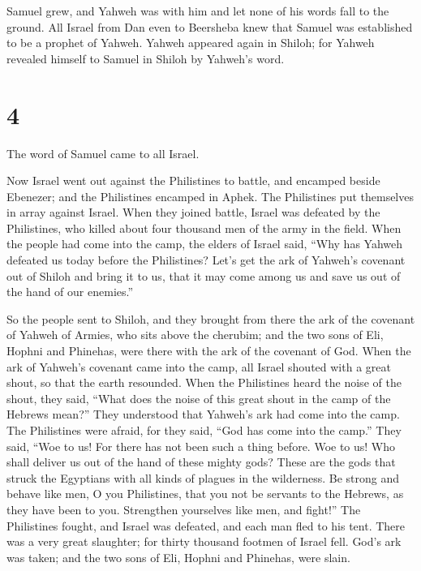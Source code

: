  Samuel grew, and Yahweh was with him and let none of his
words fall to the ground.  All Israel from Dan even to
Beersheba knew that Samuel was established to be a prophet of Yahweh.
 Yahweh appeared again in Shiloh; for Yahweh revealed
himself to Samuel in Shiloh by Yahweh's word.

\hypertarget{section-3}{%
\section{4}\label{section-3}}

 The word of Samuel came to all Israel.

Now Israel went out against the Philistines to battle, and encamped
beside Ebenezer; and the Philistines encamped in Aphek. 
The Philistines put themselves in array against Israel. When they joined
battle, Israel was defeated by the Philistines, who killed about four
thousand men of the army in the field.  When the people
had come into the camp, the elders of Israel said, ``Why has Yahweh
defeated us today before the Philistines? Let's get the ark of Yahweh's
covenant out of Shiloh and bring it to us, that it may come among us and
save us out of the hand of our enemies.''

 So the people sent to Shiloh, and they brought from there
the ark of the covenant of Yahweh of Armies, who sits above the
cherubim; and the two sons of Eli, Hophni and Phinehas, were there with
the ark of the covenant of God.  When the ark of Yahweh's
covenant came into the camp, all Israel shouted with a great shout, so
that the earth resounded.  When the Philistines heard the
noise of the shout, they said, ``What does the noise of this great shout
in the camp of the Hebrews mean?'' They understood that Yahweh's ark had
come into the camp.  The Philistines were afraid, for they
said, ``God has come into the camp.'' They said, ``Woe to us! For there
has not been such a thing before.  Woe to us! Who shall
deliver us out of the hand of these mighty gods? These are the gods that
struck the Egyptians with all kinds of plagues in the wilderness.
 Be strong and behave like men, O you Philistines, that
you not be servants to the Hebrews, as they have been to you. Strengthen
yourselves like men, and fight!''  The Philistines
fought, and Israel was defeated, and each man fled to his tent. There
was a very great slaughter; for thirty thousand footmen of Israel fell.
 God's ark was taken; and the two sons of Eli, Hophni and
Phinehas, were slain.

